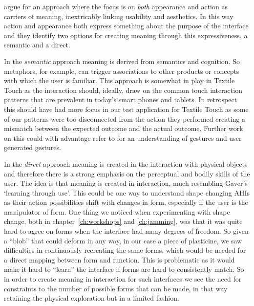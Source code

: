 \citeauthor{djajadiningrat2004tangible} argue for an approach where the focus is on \emph{both} appearance and action as carriers of meaning, inextricably linking usability and aesthetics.
In this way action and appearance both express something about the purpose of the interface and they identify two options for creating meaning through this expressiveness, a semantic and a direct.

In the \emph{semantic} approach meaning is derived from semantics and cognition.
So metaphors, for example, can trigger associations to other products or concepts with which the user is familiar.
This approach is somewhat in play in Textile Touch as the interaction should, ideally, draw on the common touch interaction patterns that are prevalent in today's smart phones and tablets.
In retrospect this should have had more focus in our test application for Textile Touch as some of our patterns were too disconnected from the action they performed creating a mismatch between the expected outcome and the actual outcome.
Further work on this could with advantage refer to \citep{wobbrock2009user,morris2010understanding} for an understanding of gestures and user generated gestures.

In the \emph{direct} approach meaning is created in the interaction with physical objects and therefore there is a strong emphasis on the perceptual and bodily skills of the user.
The idea is that meaning is created in interaction, much resembling Gaver's `learning through use'. 
This could be one way to understand shape changing AHIs as their action possibilities shift with changes in form, especially if the user is the manipulator of form.
One thing we noticed when experimenting with shape change, both in chapter~\ref{ch:workshops} and \ref{ch:jamming}, was that it was quite hard to agree on forms when the interface had many degrees of freedom.
So given a ``blob'' that could deform in any way, in our case a piece of plasticine, we saw difficulties in continuously recreating the same forms, which would be needed for a direct mapping between form and function.
This is problematic as it would make it hard to ``learn'' the interface if forms are hard to consistently match.
So in order to create meaning in interaction for such interfaces we see the need for constraints to the number of possible forms that can be made, in that way retaining the physical exploration but in a limited fashion.

